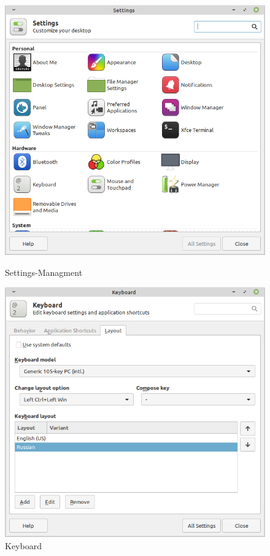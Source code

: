 \begin{figure}[!htp]
    \begin{minipage}{0.49\textwidth}
        \centering
        \includegraphics[width=\linewidth]
            {input/task-2/3/Settings-Managment.png}
        \caption{Settings-Managment}
        \label{fig:Settings-Managment}
    \end{minipage}
    \begin{minipage}{0.49\textwidth}
        \centering
        \includegraphics[width=\linewidth]
            {input/task-2/3/Keyboard.png}
        \caption{Keyboard}
        \label{fig:Keyboard}
    \end{minipage}
\end{figure}

